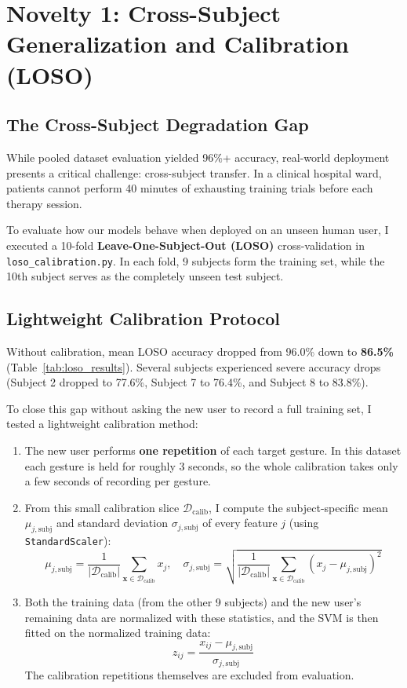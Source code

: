 \documentclass[11pt,a4paper]{article}
\begin{document}
\section{Novelty 1: Cross-Subject Generalization and Calibration (LOSO)}

\subsection{The Cross-Subject Degradation Gap}
While pooled dataset evaluation yielded 96\%+ accuracy, real-world deployment presents a critical challenge: cross-subject transfer. In a clinical hospital ward, patients cannot perform 40 minutes of exhausting training trials before each therapy session.

To evaluate how our models behave when deployed on an unseen human user, I executed a 10-fold \textbf{Leave-One-Subject-Out (LOSO)} cross-validation in \texttt{loso\_calibration.py}. In each fold, 9 subjects form the training set, while the 10th subject serves as the completely unseen test subject.

\subsection{Lightweight Calibration Protocol}
Without calibration, mean LOSO accuracy dropped from 96.0\% down to \textbf{86.5\%} (Table~\ref{tab:loso_results}). Several subjects experienced severe accuracy drops (Subject 2 dropped to 77.6\%, Subject 7 to 76.4\%, and Subject 8 to 83.8\%).

To close this gap without asking the new user to record a full training set, I tested a lightweight calibration method:
\begin{enumerate}
    \item The new user performs \textbf{one repetition} of each target gesture. In this dataset each gesture is held for roughly 3 seconds, so the whole calibration takes only a few seconds of recording per gesture.
    \item From this small calibration slice $\mathcal{D}_{\text{calib}}$, I compute the subject-specific mean $\mu_{j,\text{subj}}$ and standard deviation $\sigma_{j,\text{subj}}$ of every feature $j$ (using \texttt{StandardScaler}):
    \begin{equation}
        \mu_{j,\text{subj}} = \frac{1}{|\mathcal{D}_{\text{calib}}|} \sum_{\mathbf{x} \in \mathcal{D}_{\text{calib}}} x_j, \quad \sigma_{j,\text{subj}} = \sqrt{\frac{1}{|\mathcal{D}_{\text{calib}}|} \sum_{\mathbf{x} \in \mathcal{D}_{\text{calib}}} (x_j - \mu_{j,\text{subj}})^2}
    \end{equation}
    \item Both the training data (from the other 9 subjects) and the new user's remaining data are normalized with these statistics, and the SVM is then fitted on the normalized training data:
    \begin{equation}
        z_{ij} = \frac{x_{ij} - \mu_{j,\text{subj}}}{\sigma_{j,\text{subj}}}
    \end{equation}
    The calibration repetitions themselves are excluded from evaluation.
\end{enumerate}
\end{document}
